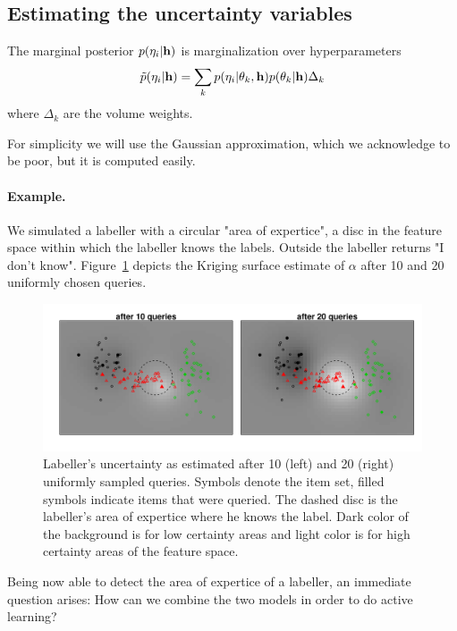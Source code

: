 \documentclass[10pt, onecolumn]{article}
\newcommand{\y}{h}
\begin{document}
\subsection{Estimating the uncertainty variables}

The marginal posterior $p(\eta_i|\bold \y)$ is marginalization over hyperparameters
\begin{eqnarray}
\tilde p(\eta_i|\bold\y) = \sum_k p(\eta_i|\bold\theta_k, \bold\y) p(\bold\theta_k | \bold\y) \Delta_k
\end{eqnarray}
where $\Delta_k$ are the volume weights.

For simplicity we will use the Gaussian approximation, which we acknowledge to be poor, but it is computed easily.




\paragraph{Example.} We simulated a labeller with a circular "area of
expertice", a disc in the feature space within which the labeller
knows the labels. Outside the labeller returns "I don't
know". Figure~\ref{fig:est_alpha1} depicts the Kriging surface
estimate of $\alpha$ after 10 and 20 uniformly chosen queries. 

\begin{figure}[hbtp]
\centering
\includegraphics[width=6in]{figures/estimated_alpha.pdf}
\caption{Labeller's uncertainty as estimated after 10 (left) and 20
  (right) uniformly sampled queries. Symbols denote the item set, filled symbols
  indicate items that were queried. The dashed disc is the labeller's
  area of expertice where he knows the label. Dark color of the
  background is for low certainty areas and light color is for high
  certainty areas of the feature space.}
\label{fig:est_alpha1}
\end{figure}

Being now able to detect the area of expertice of a labeller, an
immediate question arises: How can we combine the two models in order
to do active learning? 
\end{document}
